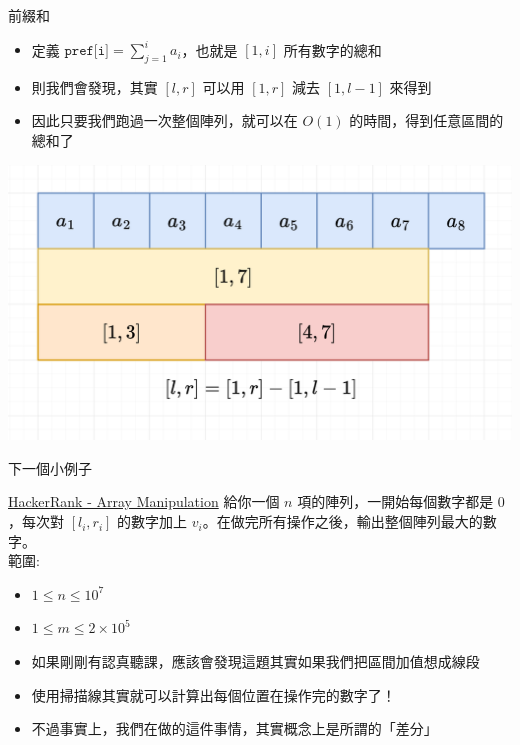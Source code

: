 \documentclass[aspectratio=169]{beamer}
\begin{document}
    \begin{frame}{前綴和}
        \begin{itemize}
            \item 定義 $\texttt{pref[i]} = \sum_{j=1}^i a_i$，也就是 $[1,i]$ 所有數字的總和
            \item 則我們會發現，其實 $[l,r]$ 可以用 $[1,r]$ 減去 $[1,l-1]$ 來得到
            \item 因此只要我們跑過一次整個陣列，就可以在 $O(1)$ 的時間，得到任意區間的總和了
        \end{itemize}
        \begin{center}
            \includegraphics[scale=0.25]{images/prefix_sum.png}
        \end{center}
    \end{frame}
    
    \begin{frame}{下一個小例子}
        \begin{block}{\href{https://www.hackerrank.com/challenges/crush/problem}{HackerRank - Array Manipulation}}
            給你一個 $n$ 項的陣列，一開始每個數字都是 $0$，每次對 $[l_i,r_i]$ 的數字加上 $v_i$。在做完所有操作之後，輸出整個陣列最大的數字。 \\
            \vspace{5mm}
            範圍: 
            \begin{itemize}
                \item $1 \le n \le 10^7$
                \item $1 \le m \le 2 \times 10^5$
            \end{itemize}
        \end{block}
        \begin{itemize}
            \item<2-> 如果剛剛有認真聽課，應該會發現這題其實如果我們把區間加值想成線段
            \item<2-> 使用掃描線其實就可以計算出每個位置在操作完的數字了！
            \item<3-> 不過事實上，我們在做的這件事情，其實概念上是所謂的「差分」
        \end{itemize}
    \end{frame}
    
\end{document}

